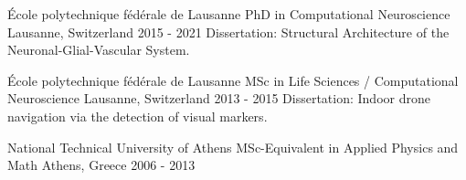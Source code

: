 


\begin{cventries}



\cventry
{École polytechnique fédérale de Lausanne} %
{PhD in Computational Neuroscience} %
{Lausanne, Switzerland} %
{2015 - 2021} %
{ %
    Dissertation: Structural Architecture of the Neuronal-Glial-Vascular System.
}


\end{cventries}

\begin{cventries}


\cventry
{École polytechnique fédérale de Lausanne} %
{MSc in Life Sciences / Computational Neuroscience} %
{Lausanne, Switzerland} %
{2013 - 2015} %
{ %
    Dissertation: Indoor drone navigation via the detection of visual markers.
}


\end{cventries}

\begin{cventries}


\cventry
{National Technical University of Athens} %
{MSc-Equivalent in Applied Physics and Math} %
{Athens, Greece} %
{2006 - 2013} %
{ %
}


\end{cventries}
